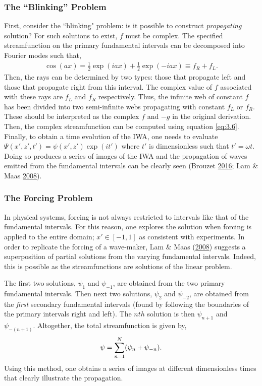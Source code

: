 \documentclass[a4paper]{article}
\numberwithin{equation}{section}
\begin{document}
\subsubsection{The “Blinking” Problem}
First, consider the “blinking" problem: is it possible to construct \emph{propagating} solution? For such solutions to exist, $f$ must be complex. The specified streamfunction on the primary fundamental intervals can be decomposed into Fourier modes such that,
\begin{align*}
\cos(ax) = \frac{1}{2}\exp(iax) + \frac{1}{2}\exp(-iax) \equiv f_R + f_L.
\end{align*}
Then, the rays can be determined by two types: those that propagate left and those that propagate right from this interval. The complex value of $f$ associated with these rays are $f_L$ and $f_R$ respectively. Thus, the infinite web of constant $f$ has been divided into two semi-infinite webs propagating with constant $f_L$ or $f_R$. These should be interpreted as the complex $f$ and $-g$ in the original derivation. Then, the complex streamfunction can be computed using equation \eqref{eq:3.6}. Finally, to obtain a time evolution of the IWA, one needs to evaluate $\Psi(x', z', t') = \psi(x',z')\exp(it')$ where $t'$ is dimensionless such that $t' = \omega t$. Doing so produces a series of images of the IWA and the propagation of waves emitted from the fundamental intervals can be clearly seen (Brouzet \protect\hyperlink{ref 9}{2016}; Lam \& Maas \hyperlink{ref 18}{2008}).

\subsubsection{The Forcing Problem}
In physical systems, forcing is not always restricted to intervals like that of the fundamental intervals. For this reason, one explores the solution when forcing is applied to the entire domain; $x' \in [-1,1]$ as consistent with experiments. In order to replicate the forcing of a wave-maker, Lam \& Maas (\hyperlink{ref 18}{2008}) suggests a superposition of partial solutions from the varying fundamental intervals. Indeed, this is possible as the streamfunctions are solutions of the linear problem. 

The first two solutions, $\psi_1$ and $\psi_{-1}$, are obtained from the two primary fundamental intervals. Then next two solutions, $\psi_2$ and $\psi_{-2}$, are obtained from the \emph{first} secondary fundamental intervals (found by following the boundaries of the primary intervals right and left). The $nth$ solution is then $\psi_{n+1}$ and $\psi_{-(n+1)}$. Altogether, the total streamfunction is given by,
\begin{equation*}
\psi = \sum_{n=1}^{N} (\psi_n + \psi_{-n}). \\
\end{equation*} 
Using this method, one obtains a series of images at different dimensionless times that clearly illustrate the propagation. 
\end{document}
